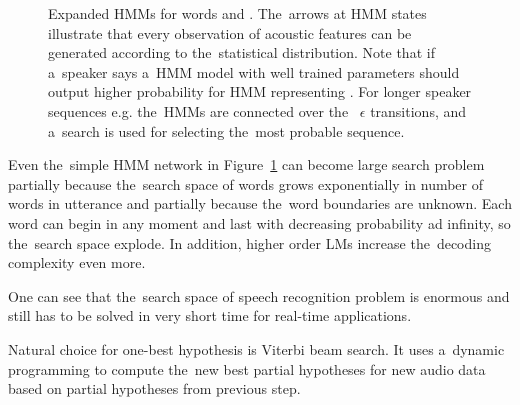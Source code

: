 \begin{figure}[!htp]
    \begin{center}
        
        \caption{Expanded \acp{HMM} for words  and . 
        The~arrows at \ac{HMM} states illustrate that every observation of acoustic features 
        can be generated according to the~statistical distribution. 
        Note that if a~speaker says  a~\ac{HMM} model with well trained parameters should output higher probability
        for \ac{HMM} representing . For longer speaker sequences e.g.  the~\acp{HMM} are connected over the~
$\epsilon$ transitions, and a~search is used for selecting the~most probable sequence.}
        \label{fig:hmm_alt} 
    \end{center}
\end{figure}

Even the~simple \ac{HMM} network in Figure~\ref{fig:hmm_alt} can become large search problem partially because the~search space of words grows exponentially in number of words in utterance and partially because the~word boundaries are unknown. 
Each word can begin in any moment and last with decreasing probability ad infinity, so the~search space explode.
In addition, higher order \acp{LM} increase the~decoding complexity even more.

One can see that the~search space of speech recognition problem is enormous and still has to be solved in very short time for real-time applications.

Natural choice for one-best hypothesis is Viterbi beam search\cite{huang2001spoken}.
It uses a~dynamic programming to compute the~new best partial hypotheses for new audio data based on partial hypotheses from previous step.

